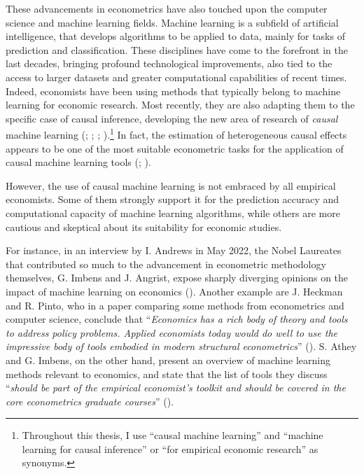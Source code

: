 \documentclass[12pt,a4paper,openright,twoside]{book}
\begin{document}
\begin{doublespacing}
These advancements in econometrics have also touched upon the computer science and machine learning fields. Machine learning is a subfield of artificial intelligence, that develops algorithms to be applied to data, mainly for tasks of prediction and classification. These disciplines have come to the forefront in the last decades, bringing profound technological improvements, also tied to the access to larger datasets and greater computational capabilities of recent times.  Indeed, economists have been using methods that typically belong to machine learning for economic research. Most recently, they are also adapting them to the specific case of causal inference, developing the new area of research of \textit{causal} machine learning (\citealp{athey2019}; \citealp{efron2020prediction}; \cite{articleml}; \citealp{lechner2023}).\footnote{Throughout this thesis, I use ``causal machine learning'' and ``machine learning for causal inference'' or ``for empirical economic research'' as synonyms.} In fact, the estimation of heterogeneous causal effects appears to be one of the most suitable econometric tasks for the application of causal machine learning tools (\citealp{curthetal}; \citealp{videoimbangr}). 



However, the use of causal machine learning is not embraced by all empirical economists. Some of them strongly support it for the prediction accuracy and computational capacity of machine learning algorithms, while others are more cautious and skeptical about its suitability for economic studies. 

For instance, in an interview by I. Andrews in May 2022, the Nobel Laureates that contributed so much to the advancement in econometric methodology themselves, G. Imbens and J. Angrist, expose sharply diverging opinions on the impact of machine learning on economics (\citealp{videoimbangr}). Another example are J. Heckman and R. Pinto, who in a paper comparing some methods from econometrics and computer science, conclude that ``\textit{Economics has a rich body of theory and tools to address policy problems. Applied economists today would do well to use the impressive body of tools embodied in modern structural econometrics}'' (\citealp{heckmanpinto2022}). S. Athey and G. Imbens, on the other hand, present an overview of machine learning methods relevant to economics, and state that the list of tools they discuss ``\textit{should be part of the empirical economist’s toolkit and should be covered in the core econometrics graduate courses}'' (\citealp{atheyimbens2019}).


\end{doublespacing}
\end{document}

